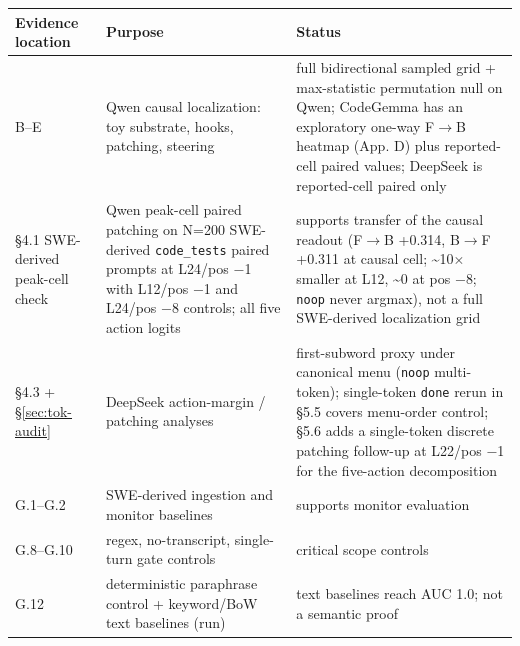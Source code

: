 \documentclass[
  11pt,
  a4paper]{article}
\newcounter{none} %
\begin{document}
{\def\LTcaptype{none} %
\begin{longtable}[]{@{}
  >{\raggedright\arraybackslash}p{}
  >{\raggedright\arraybackslash}p{}
  >{\raggedright\arraybackslash}p{}@{}}
\toprule\noalign{}
\begin{minipage}[b]{\linewidth}\raggedright
Evidence location
\end{minipage} & \begin{minipage}[b]{\linewidth}\raggedright
Purpose
\end{minipage} & \begin{minipage}[b]{\linewidth}\raggedright
Status
\end{minipage} \\
\midrule\noalign{}
\endhead
\bottomrule\noalign{}
\endlastfoot
B--E & Qwen causal localization: toy substrate, hooks, patching,
steering & full bidirectional sampled grid + max-statistic permutation
null on Qwen; CodeGemma has an exploratory one-way F\ensuremath{\rightarrow}B heatmap (App. D)
plus reported-cell paired values; DeepSeek is reported-cell paired
only \\
\S{}4.1 SWE-derived peak-cell check & Qwen peak-cell paired patching on
N=200 SWE-derived \texttt{code\_tests} paired prompts at L24/pos \ensuremath{-}1 with
L12/pos \ensuremath{-}1 and L24/pos \ensuremath{-}8 controls; all five action logits & supports
transfer of the causal readout (F\ensuremath{\rightarrow}B +0.314, B\ensuremath{\rightarrow}F +0.311 at causal cell;
\textasciitilde10\ensuremath{\times} smaller at L12, \textasciitilde0 at pos \ensuremath{-}8;
\texttt{noop} never argmax), not a full SWE-derived localization grid \\
\S{}4.3 + \S{}\ref{sec:tok-audit} & DeepSeek action-margin / patching analyses
& first-subword proxy under canonical menu (\texttt{noop} multi-token);
single-token \texttt{done} rerun in \S{}5.5 covers menu-order control; \S{}5.6
adds a single-token discrete patching follow-up at L22/pos \ensuremath{-}1 for the
five-action decomposition \\
G.1--G.2 & SWE-derived ingestion and monitor baselines & supports
monitor evaluation \\
G.8--G.10 & regex, no-transcript, single-turn gate controls & critical
scope controls \\
G.12 & deterministic paraphrase control + keyword/BoW text baselines
(run) & text baselines reach AUC 1.0; not a semantic proof \\

\end{longtable}}
\end{document}
